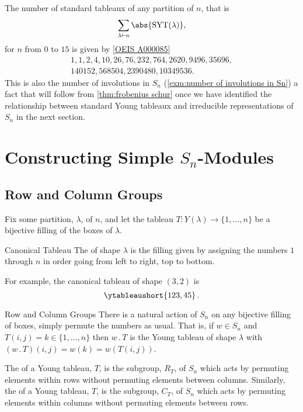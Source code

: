 \documentclass[fleqn]{NotesClass}
\newcommand{\action}{\mathbin{.}}
\newcommand{\partition}{\vdash}
\DeclareMathOperator{\standardYoungTableaux}{SYT}
\newcommand{\rowGroup}{R}
\newcommand{\columnGroup}{C}
\begin{document}
    The number of standard tableaux of any partition of \(n\), that is
    \begin{equation}
        \sum_{\lambda \partition n} \abs{\standardYoungTableaux(\lambda)},
    \end{equation}
    for \(n\) from \(0\) to \(15\) is given by [\hyperlink{https://oeis.org/A000085}{OEIS A000085}]
    \begin{gather*}
        1, 1, 2, 4, 10, 26, 76, 232, 764, \num{2620}, \num{9496}, \num{35696},\\
        \num{140152}, \num{568504}, \num{2390480}, \num{10349536}.
    \end{gather*}
    This is also the number of involutions in \(S_n\) (\cref{exm:number of involutions in Sn}) a fact that will follow from \cref{thm:frobenius schur} once we have identified the relationship between standard Young tableaux and irreducible representations of \(S_n\) in the next section.
    
    \section{Constructing Simple \texorpdfstring{\(S_n\)}{Sn}-Modules}
    \subsection{Row and Column Groups}
    Fix some partition, \(\lambda\), of \(n\), and let the tableau \(T \colon Y(\lambda) \to \{1, \dotsc, n\}\) be a bijective filling of the boxes of \(\lambda\).
    
    \begin{dfn}{Canonical Tableau}{}
        The  of shape \(\lambda\) is the filling given by assigning the numbers \(1\) through \(n\) in order going from left to right, top to bottom.
    \end{dfn}
    
    For example, the canonical tableau of shape \((3, 2)\) is
    \begin{equation}
        \ytableaushort{123,45}\,.
    \end{equation}
    
    \begin{dfn}{Row and Column Groups}{}
        There is a natural action of \(S_n\) on any bijective filling of boxes, simply permute the numbers as usual.
        That is, if \(w \in S_n\) and \(T(i, j) = k \in \{1, \dotsc, n\}\) then \(w \action T\) is the Young tableau of shape \(\lambda\) with \((w \action T)(i, j) = w(k) = w(T(i, j))\).
        
        The  of a Young tableau, \(T\), is the subgroup, \(\rowGroup_T\), of \(S_n\) which acts by permuting elements within rows without permuting elements between columns.
        Similarly, the  of a Young tableau, \(T\), is the subgroup, \(\columnGroup_T\), of \(S_n\) which acts by permuting elements within columns without permuting elements between rows.
    \end{dfn}
    
\end{document}
